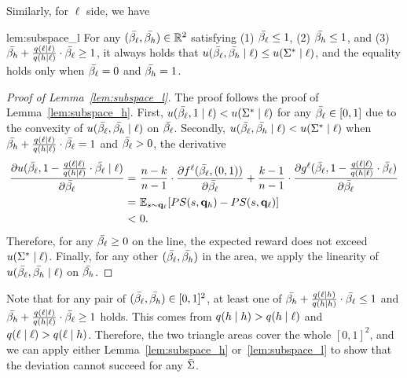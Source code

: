 Similarly, for $\ell$ side, we have 


\begin{lemnb}{lem:subspace_l}
    For any $(\bar{\beta_{\ell}}, \bar{\beta_{h}}) \in \mathbb{R}^2$ satisfying (1) $\bar{\beta_{\ell}} \le 1$, (2) $\bar{\beta_{h}} \le 1$, and (3) $\bar{\beta_{h}} + \frac{q(\ell \mid \ell)}{q (h \mid \ell)}\cdot \bar{\beta_{\ell}} \ge 1$, it always holds that $ u(\bar{\beta_{\ell}}, \bar{\beta_{h}} \mid \ell) \le u(\Sigma^*\mid \ell )$, and the equality holds only when $\bar{\beta_{\ell}} = 0$ and $\bar{\beta_{h}} = 1$. 
\end{lemnb}

\begin{proof}[Proof of Lemma~\ref{lem:subspace_l}]
    The proof follows the proof of Lemma~\ref{lem:subspace_h}. First, $u(\bar{\beta_{\ell}}, 1 \mid \ell) < u(\Sigma^* \mid \ell)$ for any $\bar{\beta_{\ell}} \in [0, 1]$ due to the convexity of $u(\bar{\beta_{\ell}}, \bar{\beta_{h}} \mid \ell)$ on $\bar{\beta_{\ell}}$. Secondly, $u(\bar{\beta_{\ell}}, \bar{\beta_{h}} \mid \ell) < u(\Sigma^* \mid \ell)$ when $\bar{\beta_{h}} + \frac{q(\ell \mid \ell)}{q (h \mid \ell)}\cdot \bar{\beta_{\ell}} = 1$ and $\bar{\beta_{\ell}} > 0$, the derivative 
    \begin{align*}
        \frac{\partial u(\bar{\beta_{\ell}}, 1 - \frac{q(\ell \mid \ell)}{q (h \mid \ell)}\cdot \bar{\beta_{\ell}} \mid \ell)}{\partial \bar{\beta_{\ell}}} =&\  \frac{n-k}{n - 1} \cdot \frac{\partial f^\ell(\bar{\beta_{\ell}}, (0, 1))}{\partial \bar{\beta_{\ell}}} + \frac{k - 1}{n - 1} \cdot \frac{\partial g^\ell(\bar{\beta_{\ell}}, 1 - \frac{q(\ell \mid \ell)}{q (h \mid \ell)}\cdot \bar{\beta_{\ell}})}{\partial \bar{\beta_{\ell}}}\\
        =&\ \mathbb{E}_{s\sim \mathbf{q}_{\ell}}[PS(s, \mathbf{q}_{h}) - PS(s, \mathbf{q}_{\ell})]\\
        < &\ 0.
    \end{align*}
    Therefore, for any $\bar{\beta_{\ell}}\ge 0$ on the line, the expected reward does not exceed $u(\Sigma^* \mid \ell)$. Finally, for any other $(\bar{\beta_{\ell}}, \bar{\beta_{h}})$ in the area, we apply the linearity of $u(\bar{\beta_{\ell}}, \bar{\beta_{h}} \mid \ell)$ on $\bar{\beta_{h}}$. 
\end{proof}

Note that for any pair of $(\bar{\beta_{\ell}}, \bar{\beta_{h}}) \in [0, 1]^2$, at least one of $\bar{\beta_{h}} + \frac{q(\ell \mid h)}{q (h \mid h)}\cdot \bar{\beta_{\ell}} \le 1$ and $\bar{\beta_{h}} + \frac{q(\ell \mid \ell)}{q (h \mid \ell)}\cdot \bar{\beta_{\ell}} \ge 1$ holds. This comes from $q(h\mid h) > q(h \mid \ell)$ and $q(\ell \mid \ell) > q(\ell \mid h)$. Therefore, the two triangle areas cover the whole $[0, 1]^2$, and we can apply either Lemma~\ref{lem:subspace_h} or~\ref{lem:subspace_l} to show that the deviation cannot succeed for any $\bar{\Sigma}$. 

